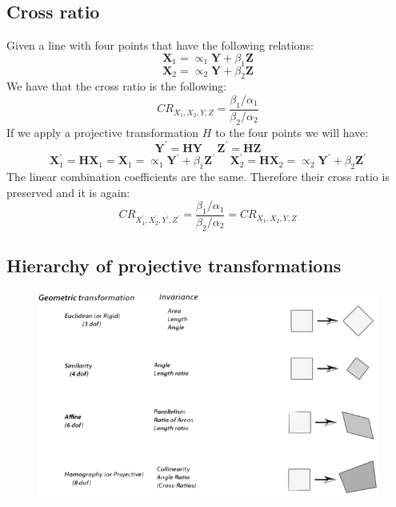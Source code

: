 \documentclass[12pt, a4paper]{report}
\newtheorem[style=M,bodystyle=\normalfont]{theorem}{Theorem}
\newtheorem[style=M,bodystyle=\normalfont]{corollary}{Corollary}
\newtheorem[style=M,bodystyle=\normalfont]{lemma}{Lemma}
\newtheorem[style=M,bodystyle=\normalfont]{definition}{Definition}
\begin{document}
    \subsection{Cross ratio}
    Given a line with four points that have the following relations: 
    \[\textbf{X}_1=\propto_1\textbf{Y}+\beta_1\textbf{Z}\]
    \[\textbf{X}_2=\propto_2\textbf{Y}+\beta_2\textbf{Z}\]
    We have that the cross ratio is the following: 
    \[CR_{X_1,X_2,Y,Z}=\dfrac{\beta_1/\alpha_1}{\beta_2/\alpha_2}\]
    If we apply a projective transformation $H$ to the four points we will have: 
    \[\textbf{Y}^{'}=\textbf{HY} \:\:\:\:\:\: \textbf{Z}^{'}=\textbf{HZ}\] 
    \[\textbf{X}^{'}_1=\textbf{HX}_1=\textbf{X}_1=\propto_1\textbf{Y}^{'}+\beta_1\textbf{Z}^{'} \:\:\:\:\:\: \textbf{X}^{'}_2=\textbf{HX}_2=\propto_2\textbf{Y}^{'}+\beta_2\textbf{Z}^{'}\]
    The linear combination coefficients are the same. Therefore their cross ratio is preserved and it is again: 
    \[CR_{X_1^{'},X_2^{'},Y^{'},Z^{'}}=\dfrac{\beta_1/\alpha_1}{\beta_2/\alpha_2}=CR_{X_1,X_2,Y,Z}\]

    \subsection{Hierarchy of projective transformations}
    \begin{figure}[H]
        \centering
        \includegraphics[width=1\linewidth]{images/hierarchy.png}
    \end{figure}
\end{document}
